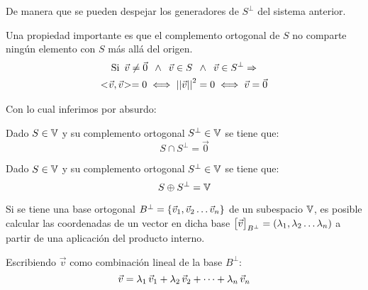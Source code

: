 De manera que se pueden despejar los generadores de $S^\perp$ del sistema anterior.

Una propiedad importante es que el complemento ortogonal de $S$ no comparte ningún elemento con $S$ más allá del origen.
\begin{gather*}
    \textrm{Si} \enspace \Vec{v} \neq \Vec{0} \enspace \land \enspace \Vec{v} \in S \enspace \land \enspace \Vec{v} \in S^\perp \Rightarrow
    \\
    <\hspace{-0.8mm}\Vec{v},\Vec{v}\hspace{-0.8mm}> = 0 \iff {\left|\left| {\Vec{v}} \right|\right|}^2 = 0 \iff \Vec{v} = \Vec{0}
\end{gather*}

Con lo cual inferimos por absurdo:

\begin{mdframed}[style=PropertyFrame]
    \begin{prop}
    \end{prop}
    Dado $S \in \mathbb{V}$ y su complemento ortogonal $S^\perp \in \mathbb{V}$ se tiene que:
    \begin{equation*}
        S \cap S^\perp = \Vec{0}
    \end{equation*}
\end{mdframed}

\begin{mdframed}[style=PropertyFrame]
    \begin{prop}
        \label{prop:comp2}
    \end{prop}
    Dado $S \in \mathbb{V}$ y su complemento ortogonal $S^\perp \in \mathbb{V}$ se tiene que:
    \begin{equation*}
        S \oplus S^\perp = \mathbb{V}
    \end{equation*}
\end{mdframed}

Si se tiene una base ortogonal $B^\perp = { \left\{ {\Vec{v}_1 , \Vec{v}_2 \dots \Vec{v}_n} \right\} }$ de un subespacio $\mathbb{V}$, es posible calcular las coordenadas de un vector en dicha base ${ \begin{bmatrix} \Vec{v} \end{bmatrix} }_{B^\perp}=(\lambda_1 , \lambda_2 \dots \lambda_n)$ a partir de una aplicación del producto interno.

Escribiendo $\Vec{v}$ como combinación lineal de la base $B^\perp$:
\begin{equation*}
    \Vec{v} = \lambda_1 \, \Vec{v}_1 + \lambda_2 \, \Vec{v}_2 + \dots + \lambda_n \, \Vec{v}_n
\end{equation*}

